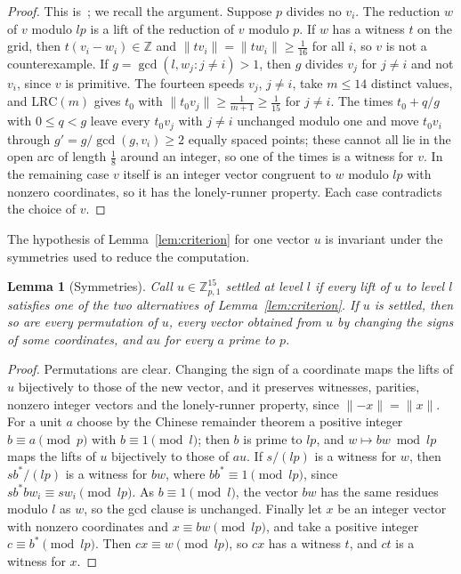 \documentclass[aps,prd,twocolumn,superscriptaddress,nofootinbib,longbibliography,floatfix,showkeys,amsmath,amssymb,10pt]{revtex4-2}
\newtheorem{lemma}[theorem]{Lemma}
\theoremstyle{definition}
\theoremstyle{remark}
\newcommand{\Z}{\mathbb{Z}}
\newcommand{\LRC}{\mathrm{LRC}}
\begin{document}
\begin{proof}
This is~\cite[Lemma~2.2]{All26}; we recall the argument. Suppose $p$ divides
no $v_i$. The reduction $w$ of $v$ modulo $lp$ is a lift of the reduction of
$v$ modulo $p$. If $w$ has a witness $t$ on the grid, then $t(v_i-w_i)\in\Z$
and $\|tv_i\|=\|tw_i\|\ge\frac1{16}$ for all $i$, so $v$ is not a
counterexample. If $g=\gcd(l,w_j:j\ne i)>1$, then $g$ divides $v_j$ for
$j\ne i$ and not $v_i$, since $v$ is primitive. The fourteen speeds $v_j$,
$j\ne i$, take $m\le 14$ distinct values, and $\LRC(m)$ gives $t_0$ with
$\|t_0v_j\|\ge\frac1{m+1}\ge\frac1{15}$ for $j\ne i$. The times
$t_0+q/g$ with $0\le q<g$ leave every $t_0v_j$ with $j\ne i$ unchanged
modulo one and move $t_0v_i$ through $g'=g/\gcd(g,v_i)\ge2$ equally spaced
points; these cannot all lie in the open arc of length $\frac18$ around an
integer, so one of the times is a witness for $v$. In the remaining case $v$
itself is an integer vector congruent to $w$ modulo $lp$ with nonzero
coordinates, so it has the lonely-runner property. Each case contradicts
the choice of $v$.
\end{proof}

The hypothesis of Lemma~\ref{lem:criterion} for one vector $u$ is invariant
under the symmetries used to reduce the computation.

\begin{lemma}[Symmetries]\label{lem:symm}
Call $u\in\Z_{p,1}^{15}$ \emph{settled at level $l$} if every lift of $u$ to
level $l$ satisfies one of the two alternatives of
Lemma~\ref{lem:criterion}. If $u$ is settled, then so are every permutation
of $u$, every vector obtained from $u$ by changing the signs of some
coordinates, and $au$ for every $a$ prime to $p$.
\end{lemma}

\begin{proof}
Permutations are clear. Changing the sign of a coordinate maps the lifts of
$u$ bijectively to those of the new vector, and it preserves witnesses,
parities, nonzero integer vectors and the lonely-runner property, since
$\|{-x}\|=\|x\|$. For a unit $a$ choose by the Chinese remainder theorem a
positive integer $b\equiv a\pmod p$ with $b\equiv1\pmod l$; then $b$ is
prime to $lp$, and $w\mapsto bw\bmod lp$ maps the lifts of $u$ bijectively
to those of $au$. If $s/(lp)$ is a witness for $w$, then $sb^*/(lp)$ is a
witness for $bw$, where $bb^*\equiv1\pmod{lp}$, since
$sb^*bw_i\equiv sw_i\pmod{lp}$. As $b\equiv1\pmod l$, the vector $bw$ has
the same residues modulo $l$ as $w$, so the gcd clause is unchanged. Finally
let $x$ be an integer vector with nonzero coordinates and $x\equiv bw\pmod
{lp}$, and take a positive integer $c\equiv b^*\pmod{lp}$. Then
$cx\equiv w\pmod{lp}$, so $cx$ has a witness $t$, and $ct$ is a witness for
$x$.
\end{proof}
\end{document}
